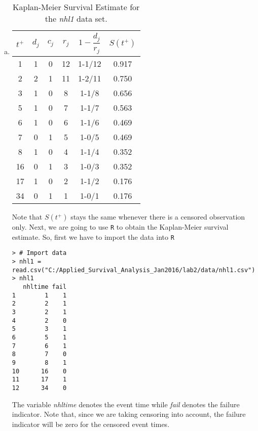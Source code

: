 \begin{enumerate}[(a)]
\item \begin{table}[ht]
\caption{Kaplan-Meier Survival Estimate for the \emph{nhl1} data set.}
\centering
\begin{tabular}{c c c c c c}
\hline
\hline
 $t^{+}$ & $d_{j}$ & $c_{j}$ & $r_{j}$ 
 &$1-\dfrac{d_{j}}{r_{j}}$&$S(t^{+})$  \\ \hline
     1  & 1 & 0 & 12 & 1-1/12 & 0.917 \\
     2  & 2 & 1 & 11 & 1-2/11 & 0.750 \\
     3  & 1 & 0 & 8  & 1-1/8 & 0.656 \\ 
     5  & 1 & 0 & 7  & 1-1/7 & 0.563 \\
     6  & 1 & 0 & 6  & 1-1/6 & 0.469 \\
     7  & 0 & 1 & 5  & 1-0/5& 0.469 \\ 
     8  & 1 & 0 & 4  & 1-1/4& 0.352 \\ 
    16  & 0 & 1 & 3  & 1-0/3& 0.352 \\ 
    17  & 1 & 0 & 2  & 1-1/2& 0.176 \\ 
    34  & 0 & 1 & 1  & 1-0/1& 0.176 \\
\hline
\end{tabular}
\label{table:1}
\end{table}
Note that $S(t^{+})$ stays the same whenever there is a censored observation only.
Next, we are going to use \verb|R| to obtain the Kaplan-Meier survival estimate. 
So, first we have to import the data into \verb|R|
\begin{footnotesize}
\begin{verbatim}
> # Import data
> nhl1 = read.csv("C:/Applied_Survival_Analysis_Jan2016/lab2/data/nhl1.csv")
> nhl1
   nhltime fail
1        1    1
2        2    1
3        2    1
4        2    0
5        3    1
6        5    1
7        6    1
8        7    0
9        8    1
10      16    0
11      17    1
12      34    0
\end{verbatim}
\end{footnotesize}
The variable \emph{nhltime} denotes the event time while \emph{fail} denotes the failure indicator. Note that, since we are taking censoring into account, the failure indicator will be zero for the censored event times.


\end{enumerate}
